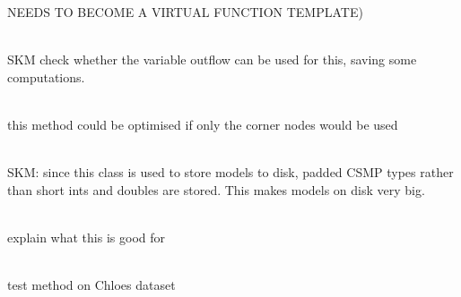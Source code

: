 \begin{DoxyRefList}
\label{todo__todo000046}%
%
NEEDS TO BECOME A VIRTUAL FUNCTION TEMPLATE)  
\item[Member \doxylink{classcsmp_1_1_explicit_transport_aa747da759e6e9187279aa53d99217376}{csmp\+::Explicit\+Transport\texorpdfstring{$<$}{<} dim \texorpdfstring{$>$}{>}\+::Outgoing\+Volumetric\+Flow} () const]\hfill \\
\label{todo__todo000091}%
%
SKM check whether the variable \textquotesingle{}outflow\textquotesingle{} can be used for this, saving some computations.  
\item[Member \doxylink{classcsmp_1_1_face_a62ca872a7981b72f22b291582e53b227}{csmp\+::Face\texorpdfstring{$<$}{<} dim \texorpdfstring{$>$}{>}\+::Length\+In\+Direction} (const \doxylink{classcsmp_1_1_vector_variable}{Vector\+Variable$<$ dim $>$} \&vec\+Direction) const]\hfill \\
\label{todo__todo000146}%
%
this method could be optimised if only the corner nodes would be used 
\item[Class \doxylink{classcsmp_1_1_f_e_m___data}{csmp\+::FEM\+\_\+\+Data\texorpdfstring{$<$}{<} csp\+\_\+type \texorpdfstring{$>$}{>}} ]\hfill \\
\label{todo__todo000049}%
%
SKM\+: since this class is used to store models to disk, padded CSMP types rather than short int\textquotesingle{}s and doubles are stored. This makes models on disk very big.  
\item[Namespace \doxylink{namespacecsmp_1_1fem_data_output_dispatch}{csmp\+::fem\+Data\+Output\+Dispatch} ]\hfill \\
\label{todo__todo000056}%
%
explain what this is good for  
\item[Member \doxylink{namespacecsmp_a5a072e7ccba5904192dd49870d9f68c3}{csmp\+::find\+Split\+Interface\+Elements} (const \doxylink{classcsmp_1_1_region}{Region$<$ dim $>$} \&subdomain, vector\texorpdfstring{$<$}{<} pair\texorpdfstring{$<$}{<} pair\texorpdfstring{$<$}{<} \doxylink{classcsmp_1_1_element}{Element$<$ dim $>$} \texorpdfstring{$\ast$}{*}, uint32\+\_\+t \texorpdfstring{$>$}{>}, pair\texorpdfstring{$<$}{<} \doxylink{classcsmp_1_1_element}{Element$<$ dim $>$} \texorpdfstring{$\ast$}{*}, uint32\+\_\+t \texorpdfstring{$>$}{>} \texorpdfstring{$>$}{>} \texorpdfstring{$>$}{>} \&interface\+\_\+elmt\+\_\+pairs)]\hfill \\
\label{todo__todo000158}%
%
test method on Chloe\textquotesingle{}s dataset  

\end{DoxyRefList}
